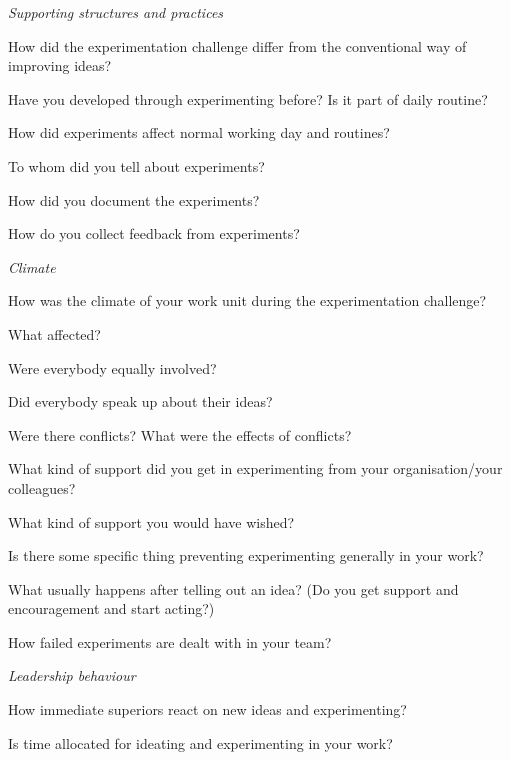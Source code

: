 \noindent\emph{Supporting structures and practices}
\vspace{-3mm} 
\begin{list}{*}{}
\setlength{\itemsep}{-3pt}
    \item How did the experimentation challenge differ from the conventional way of improving ideas?
    \item Have you developed through experimenting before? Is it part of daily routine?
    \item How did experiments affect normal working day and routines?
    \item To whom did you tell about experiments?
    \item How did you document the experiments?
    \item How do you collect feedback from experiments?
    \medskip
\end{list}

\noindent\emph{Climate}
\vspace{-3mm} 
\begin{list}{*}{}
\setlength{\itemsep}{-3pt}
    \item How was the climate of your work unit during the experimentation challenge?
    \item What affected?
    \item Were everybody equally involved?
    \item Did everybody speak up about their ideas? 
    \item Were there conflicts? What were the effects of conflicts?
    \item What kind of support did you get in experimenting from your organisation/your colleagues? 
    \item What kind of support you would have wished?
    \item Is there some specific thing preventing experimenting generally in your work?
    \item What usually happens after telling out an idea? (Do you get support and encouragement and start acting?)
    \item How failed experiments are dealt with in your team? 
\end{list}

\noindent\emph{Leadership behaviour}
\vspace{-3mm} 
\begin{list}{*}{}
\setlength{\itemsep}{-3pt}
    \item How immediate superiors react on new ideas and experimenting?
    \item Is time allocated for ideating and experimenting in your work?
    \end{list}
    
